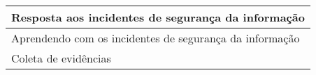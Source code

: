\begin{table}[]
\begin{center}
\begin{tabular}{|l|}
Resposta aos incidentes de segurança da informação                                                                                                                                                                                                                                                           \\ \hline
Aprendendo com os incidentes de segurança da informação                                                                                                                                                                                                                                                      \\ \hline
Coleta de evidências                                                                                                                                                                                                                                                                                         \\ \hline
\end{tabular}
\end{center}
\end{table}


